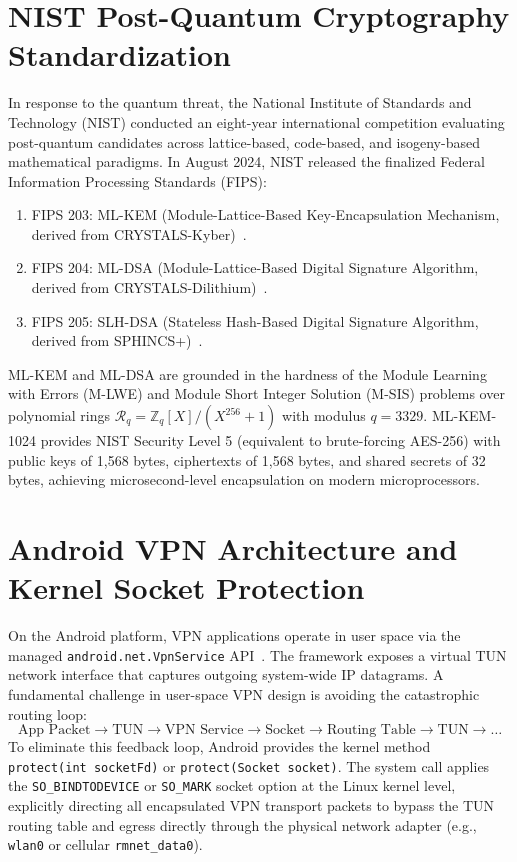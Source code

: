\section{NIST Post-Quantum Cryptography Standardization}
\label{sec:nist_standardization}

In response to the quantum threat, the National Institute of Standards and Technology (NIST) conducted an eight-year international competition evaluating post-quantum candidates across lattice-based, code-based, and isogeny-based mathematical paradigms. In August 2024, NIST released the finalized Federal Information Processing Standards (FIPS):
\begin{enumerate}
    \item FIPS 203: ML-KEM (Module-Lattice-Based Key-Encapsulation Mechanism, derived from CRYSTALS-Kyber)~\cite{nist_fips_203}.
    \item FIPS 204: ML-DSA (Module-Lattice-Based Digital Signature Algorithm, derived from CRYSTALS-Dilithium)~\cite{nist_fips_204}.
    \item FIPS 205: SLH-DSA (Stateless Hash-Based Digital Signature Algorithm, derived from SPHINCS+)~\cite{nist_fips_205}.
\end{enumerate}

ML-KEM and ML-DSA are grounded in the hardness of the Module Learning with Errors (M-LWE) and Module Short Integer Solution (M-SIS) problems over polynomial rings $\mathcal{R}_q = \mathbb{Z}_q[X]/(X^{256} + 1)$ with modulus $q = 3329$. ML-KEM-1024 provides NIST Security Level 5 (equivalent to brute-forcing AES-256) with public keys of 1,568 bytes, ciphertexts of 1,568 bytes, and shared secrets of 32 bytes, achieving microsecond-level encapsulation on modern microprocessors.

\section{Android VPN Architecture and Kernel Socket Protection}
\label{sec:android_vpn_arch}

On the Android platform, VPN applications operate in user space via the managed \texttt{android.net.VpnService} API~\cite{android_vpnservice_docs}. The framework exposes a virtual TUN network interface that captures outgoing system-wide IP datagrams. A fundamental challenge in user-space VPN design is avoiding the catastrophic routing loop:
\begin{equation}
\text{App Packet} \to \text{TUN} \to \text{VPN Service} \to \text{Socket} \to \text{Routing Table} \to \text{TUN} \to \dots
\end{equation}
To eliminate this feedback loop, Android provides the kernel method \texttt{protect(int socketFd)} or \texttt{protect(Socket socket)}. The system call applies the \texttt{SO\_\allowbreak BINDTODEVICE} or \texttt{SO\_MARK} socket option at the Linux kernel level, explicitly directing all encapsulated VPN transport packets to bypass the TUN routing table and egress directly through the physical network adapter (e.g., \texttt{wlan0} or cellular \texttt{rmnet\_data0}).


